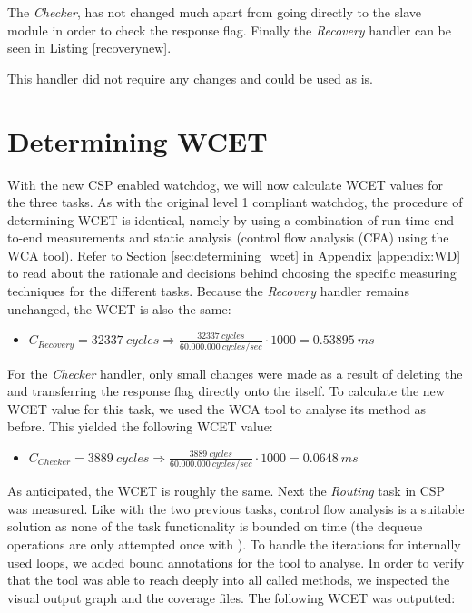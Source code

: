

The \textit{Checker}, has not changed much apart from going directly to the slave module in order to check the response flag. Finally the \textit{Recovery} handler can be seen in Listing \ref{recoverynew}.



This handler did not require any changes and could be used as is.

\section{Determining WCET}
With the new CSP enabled watchdog, we will now calculate WCET values for the three tasks. As with the original level 1 compliant watchdog, the procedure of determining WCET is identical, namely by using a combination of run-time end-to-end measurements and static analysis (control flow analysis (CFA) using the WCA tool). Refer to Section \ref{sec:determining_wcet} in Appendix \ref{appendix:WD} to read about the rationale and decisions behind choosing the specific measuring techniques for the different tasks. Because the \textit{Recovery} handler remains unchanged, the WCET is also the same:

\begin{itemize}
	\item $C_{Recovery} = 32337\ cycles \Rightarrow \frac{32337\ cycles}{60.000.000\ cycles/sec} \cdot 1000 = 0.53895\ ms$
\end{itemize}

For the \textit{Checker} handler, only small changes were made as a result of deleting the  and transferring the response flag directly onto the  itself. To calculate the new WCET value for this task, we used the WCA tool to analyse its  method as before. This yielded the following WCET value:

\begin{itemize}
	\item $C_{Checker} = 3889\ cycles \Rightarrow \frac{3889\ cycles}{60.000.000\ cycles/sec} \cdot 1000 = 0.0648\ ms$
\end{itemize}

As anticipated, the WCET is roughly the same. Next the \textit{Routing} task in CSP was measured. Like with the two previous tasks, control flow analysis is a suitable solution as none of the task functionality is bounded on time (the dequeue operations are only attempted once with ). To handle the iterations for internally used loops, we added bound annotations for the tool to analyse. In order to verify that the tool was able to reach deeply into all called methods, we inspected the visual output graph and the coverage files. The following WCET was outputted:

